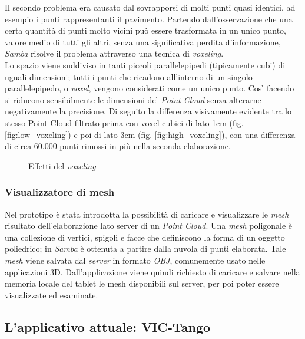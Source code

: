 \noindent
Il secondo problema era causato dal sovrapporsi di molti punti quasi identici, ad esempio i punti rappresentanti il pavimento. Partendo dall'osservazione che una certa quantità di punti molto vicini può essere trasformata in un unico punto, valore medio di tutti gli altri, senza una significativa perdita d'informazione, \emph{Samba} risolve il problema attraverso una tecnica di \emph{voxeling}.\\
Lo spazio viene suddiviso in tanti piccoli parallelepipedi (tipicamente cubi) di uguali dimensioni; tutti i punti che ricadono all'interno di un singolo parallelepipedo, o \emph{voxel}, vengono considerati come un unico punto. Così facendo si riducono sensibilmente le dimensioni del \emph{Point Cloud} senza alterarne negativamente la precisione.
Di seguito la differenza visivamente evidente tra lo stesso Point Cloud filtrato prima con voxel cubici di lato 1cm (fig. \ref{fig:low_voxeling}) e poi di lato 3cm (fig. \ref{fig:high_voxeling}), con una differenza di circa 60.000 punti rimossi in più nella seconda elaborazione.
\begin{figure}[htp] 
    \centering
    \hfill%
    \caption{Effetti del \emph{voxeling}}
\end{figure}
\newline

\subsubsection{Visualizzatore di mesh}
Nel prototipo è stata introdotta la possibilità di caricare e visualizzare le \emph{mesh} risultato dell'elaborazione lato server di un \emph{Point Cloud}.
Una \emph{mesh} poligonale è una collezione di vertici, spigoli e facce che definiscono la forma di un oggetto poliedrico; in \emph{Samba} è ottenuta a partire dalla nuvola di punti elaborata.
Tale \emph{mesh} viene salvata dal \emph{server} in formato \emph{OBJ}, comunemente usato nelle applicazioni 3D. Dall'applicazione viene quindi richiesto di caricare e salvare nella memoria locale del tablet le mesh disponibili sul server, per poi poter essere visualizzate ed esaminate.


\subsection{L'applicativo attuale: VIC-Tango}


